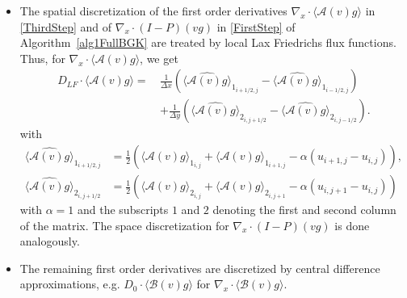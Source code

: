 \documentclass[final,11pt]{siamart251216}
\numberwithin{equation}{section}
\theoremstyle{definition}
\theoremstyle{remark}
\begin{document}
\begin{itemize}
	\item The spatial discretization of the first order derivatives  $\nabla_x \cdot \langle \mathcal{A}(v) g \rangle$  in  \eqref{ThirdStep} and of $\nabla_x \cdot (I-P) (vg)$  in \eqref{FirstStep} of Algorithm~\ref{alg1FullBGK} are treated by local Lax Friedrichs flux functions. Thus, for $\nabla_x \cdot \langle \mathcal{A}(v) g \rangle$, we get 
\begin{equation}
\begin{split}
D_{LF} \cdot \langle \mathcal{A}(v) g \rangle = \, & \frac{1}{\Delta x} \left( \widehat{\langle \mathcal{A}(v) g \rangle}_{1_{i+1/2,j}} - \widehat{\langle \mathcal{A}(v) g \rangle}_{1_{i-1/2,j}} \right) \\
& + \frac{1}{\Delta y} \left( \widehat{\langle \mathcal{A}(v) g \rangle}_{2_{i,j+1/2}} - \widehat{\langle \mathcal{A}(v) g \rangle}_{2_{i,j-1/2}} \right).
\end{split}
\end{equation}
	with
	\begin{align}\nonumber
		\widehat{\langle \mathcal{A}(v) g \rangle}_{1_{i+1/2,j}} &= \frac{1}{2} \left( \langle \mathcal{A}(v) g \rangle_{1_{i,j}} + \langle \mathcal{A}(v) g \rangle_{1_{i+1,j}} - \alpha (u_{i+1,j} - u_{i,j})\right),\\ 
		\widehat{\langle \mathcal{A}(v) g \rangle}_{2_{i,j+1/2}} &= \frac{1}{2} \left( \langle \mathcal{A}(v) g \rangle_{2_{i,j}} + \langle \mathcal{A}(v) g \rangle_{2_{i,j+1}} - \alpha (u_{i,j+1} - u_{i,j})\right)
	\end{align}
	with $\alpha = 1$ and the subscripts $1$ and $2$ denoting the first and second column of the matrix. The space discretization for $\nabla_x \cdot (I-P)(vg)$ is done analogously.
		\item The remaining first order derivatives are discretized by central difference approximations, e.g. $D_0 \cdot \langle \mathcal{B}(v) g \rangle$ for $\nabla_x \cdot \langle \mathcal{B}(v) g \rangle$.

\end{itemize}
\end{document}
